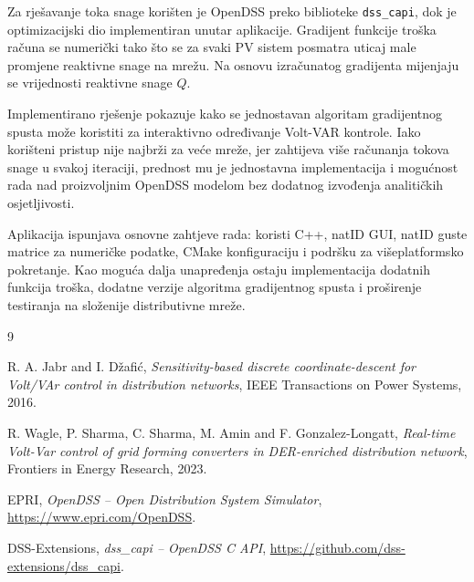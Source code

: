 \documentclass[12pt,oneside, a4paper]{book}
\begin{document}
Za rješavanje toka snage korišten je OpenDSS preko biblioteke \texttt{dss\_capi}, dok je optimizacijski dio implementiran unutar aplikacije. Gradijent funkcije troška računa se numerički tako što se za svaki PV sistem posmatra uticaj male promjene reaktivne snage na mrežu. Na osnovu izračunatog gradijenta mijenjaju se vrijednosti reaktivne snage $Q$.

Implementirano rješenje pokazuje kako se jednostavan algoritam gradijentnog spusta može koristiti za interaktivno određivanje Volt-VAR kontrole. Iako korišteni pristup nije najbrži za veće mreže, jer zahtijeva više računanja tokova snage u svakoj iteraciji, prednost mu je jednostavna implementacija i mogućnost rada nad proizvoljnim OpenDSS modelom bez dodatnog izvođenja analitičkih osjetljivosti.

Aplikacija ispunjava osnovne zahtjeve rada: koristi C++, natID GUI, natID guste matrice za numeričke podatke, CMake konfiguraciju i podršku za višeplatformsko pokretanje. Kao moguća dalja unapređenja ostaju implementacija dodatnih funkcija troška, dodatne verzije algoritma gradijentnog spusta i proširenje testiranja na složenije distributivne mreže.


\begin{thebibliography}{9}


R. A. Jabr and I. Džafić, 
\textit{Sensitivity-based discrete coordinate-descent for Volt/VAr control in distribution networks}, 
IEEE Transactions on Power Systems, 2016.

R. Wagle, P. Sharma, C. Sharma, M. Amin and F. Gonzalez-Longatt, 
\textit{Real-time Volt-Var control of grid forming converters in DER-enriched distribution network}, 
Frontiers in Energy Research, 2023.

EPRI, \textit{OpenDSS -- Open Distribution System Simulator}, 
\url{https://www.epri.com/OpenDSS}.

DSS-Extensions, \textit{dss\_capi -- OpenDSS C API}, 
\url{https://github.com/dss-extensions/dss_capi}.


\end{thebibliography}
\end{document}
